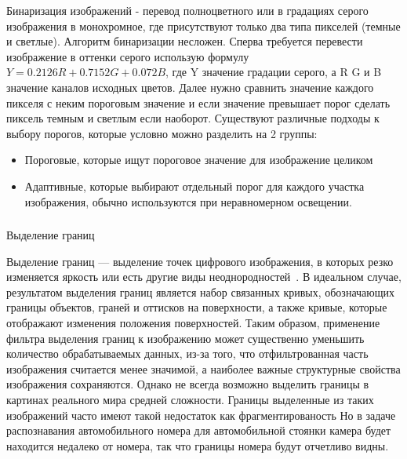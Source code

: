 Бинаризация изображений - перевод полноцветного или в градациях серого изображения в монохромное, где присутствуют только два типа пикселей (темные и светлые).\cite{binary_image}
Алгоритм бинаризации несложен. Сперва требуется перевести изображение в оттенки серого использую формулу $ Y = 0.2126R + 0.7152G + 0.072B $, где Y значение градации серого, а R G и B значение каналов исходных цветов. Далее нужно сравнить значение каждого пикселя с неким пороговым значение и если значение превышает порог сделать пиксель темным и светлым если наоборот. 
Существуют различные подходы к выбору порогов, которые условно можно разделить на 2 группы:
\begin{itemize}
  \item Пороговые, которые ищут пороговое значение для изображение целиком
  \item Адаптивные, которые выбирают отдельный порог для каждого участка изображения, обычно используются при неравномерном освещении.
\end{itemize}

\subsubsection{}
\label{sub:domain:image_processing:edge_detection}
Выделение границ

Выделение границ — выделение точек цифрового изображения, в которых резко изменяется яркость или есть другие виды неоднородностей~\cite{edge_detection}.
В идеальном случае, результатом выделения границ является набор связанных кривых, обозначающих границы объектов, граней и оттисков на поверхности, а также кривые, которые отображают изменения положения поверхностей. Таким образом, применение фильтра выделения границ к изображению может существенно уменьшить количество обрабатываемых данных, из-за того, что отфильтрованная часть изображения считается менее значимой, а наиболее важные структурные свойства изображения сохраняются. Однако не всегда возможно выделить границы в картинах реального мира средней сложности. Границы выделенные из таких изображений часто имеют такой недостаток как фрагментированость Но в задаче распознавания автомобильного номера для автомобильной стоянки камера будет находится недалеко от номера, так что границы номера будут отчетливо видны.


